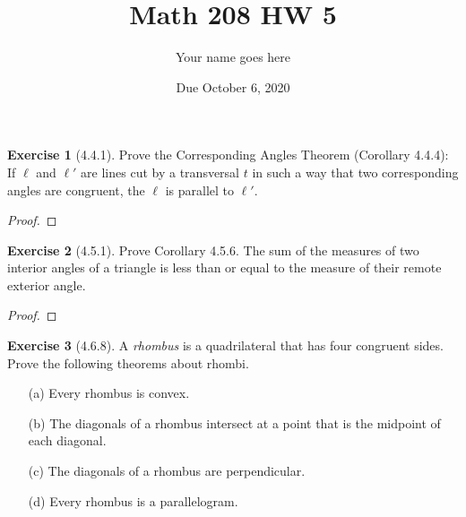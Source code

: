 \documentclass[12pt]{article}		%
\title{Math 208 HW 5}
\author{Your name goes here}
\date{Due October 6, 2020}
\theoremstyle{definition}
\newtheorem*{ex}{Exercise}
\begin{document}
	\maketitle
	
	


\begin{ex}[4.4.1]  Prove the Corresponding Angles Theorem (Corollary 4.4.4): If $\ell$ and $\ell'$ are lines cut by a transversal $t$ in such a way that two corresponding angles are congruent, the $\ell$ is parallel to $\ell'$.
	
\end{ex}

\begin{proof} 
	
\end{proof}



\vspace{1in} %





\begin{ex}[4.5.1] Prove Corollary 4.5.6.  The sum of the measures of two interior angles of a triangle is less than or equal to the measure of their remote exterior angle.
	
\end{ex}

\begin{proof} 
	
\end{proof}



\vspace{1in} %




\begin{ex}[4.6.8]
	A \textit{rhombus} is a quadrilateral that has four congruent sides.  Prove the following theorems about rhombi.
	\begin{itemize}
		\item[(a)]  Every rhombus is convex.
		\item[(b)]  The diagonals of a rhombus intersect at a point that is the midpoint of each diagonal.
		\item[(c)]  The diagonals of a rhombus are perpendicular.
		\item[(d)]  Every rhombus is a parallelogram.
	\end{itemize}
\end{ex}
\end{document}
